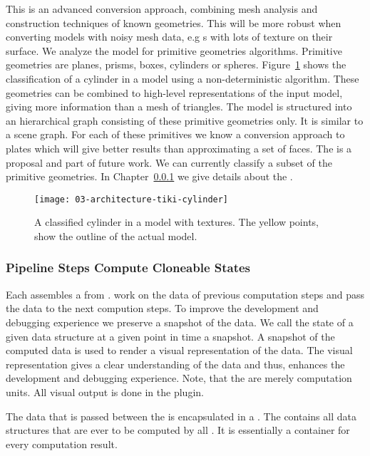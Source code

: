 \documentclass[../../ClassicThesis.tex]{subfiles}
\begin{document}
This is an advanced conversion approach, combining mesh
analysis and construction techniques of known geometries.
This \class{\fabmethod} will be more robust when converting
models with noisy mesh data, e.g {\threedmodel}s with lots
of texture on their surface. We analyze the model for
primitive geometries algorithms. Primitive geometries are
planes, prisms, boxes, cylinders or spheres.
Figure~\ref{fig:tiki-cylinder} shows the classification of a
cylinder in a model using a non-deterministic algorithm.
These geometries can be combined to high-level
representations of the input model, giving more information
than a mesh of triangles. The model is structured into an
hierarchical graph consisting of these primitive geometries
only. It is similar to a scene graph. For each of these
primitives we know a conversion approach to plates which
will give better results than approximating a set of faces.
The  is a proposal and part of
future work. We can currently classify a subset of the
primitive geometries. In Chapter~\ref{}  we give details about the .

\begin{figure}[h]
  \centering
  \texttt{[image: 03-architecture-tiki-cylinder]}
  \caption{A classified cylinder in a model with textures.
    The yellow points, show the outline of the actual model.}
  \label{fig:tiki-cylinder}
\end{figure}

\subsubsection{Pipeline Steps Compute Cloneable States}

Each \class{\fabmethod} assembles a  from
.  work on the
data of previous computation steps and pass the data to the
next compution steps. To improve the development and
debugging experience we preserve a snapshot of the data. We
call the state of a given data structure at a given point in
time a snapshot. A snapshot of the computed data is used to
render a visual representation of the data. The visual
representation gives a clear understanding of the data and
thus, enhances the development and debugging experience.
Note, that the  are merely computation
units. All visual output is done in the
 plugin.

The data that is passed between the  is
encapsulated in a . The
 contains all data structures that are
ever to be computed by all . It is
essentially a container for every computation result.
\end{document}
